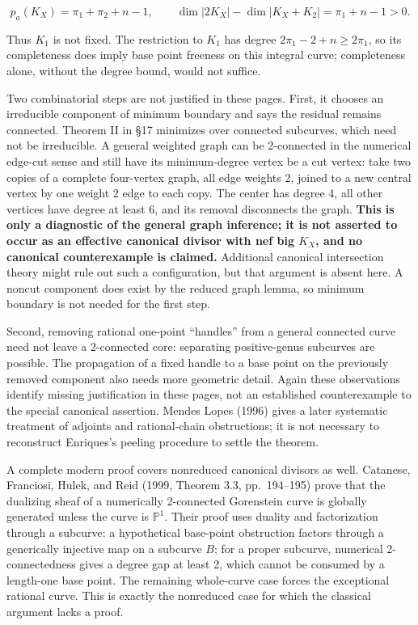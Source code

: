 \[
p_a(K_X)=\pi_1+\pi_2+n-1,\qquad
\dim|2K_X|-\dim|K_X+K_2|=\pi_1+n-1>0.
\]

Thus \(K_1\) is not fixed. The restriction to \(K_1\) has degree \(2\pi_1-2+n\ge 2\pi_1\), so its completeness does imply base point freeness on this integral curve; completeness alone, without the degree bound, would not suffice.

Two combinatorial steps are not justified in these pages. First, it chooses an irreducible component of minimum boundary and says the residual remains connected. Theorem II in §17 minimizes over connected subcurves, which need not be irreducible. A general weighted graph can be 2-connected in the numerical edge-cut sense and still have its minimum-degree vertex be a cut vertex: take two copies of a complete four-vertex graph, all edge weights 2, joined to a new central vertex by one weight 2 edge to each copy. The center has degree 4, all other vertices have degree at least 6, and its removal disconnects the graph. \textbf{This is only a diagnostic of the general graph inference; it is not asserted to occur as an effective canonical divisor with nef big \(K_X\), and no canonical counterexample is claimed.} Additional canonical intersection theory might rule out such a configuration, but that argument is absent here. A noncut component does exist by the reduced graph lemma, so minimum boundary is not needed for the first step.

Second, removing rational one-point ``handles'' from a general connected curve need not leave a 2-connected core: separating positive-genus subcurves are possible. The propagation of a fixed handle to a base point on the previously removed component also needs more geometric detail. Again these observations identify missing justification in these pages, not an established counterexample to the special canonical assertion. Mendes Lopes (1996) gives a later systematic treatment of adjoints and rational-chain obstructions; it is not necessary to reconstruct Enriques's peeling procedure to settle the theorem.

A complete modern proof covers nonreduced canonical divisors as well. Catanese, Franciosi, Hulek, and Reid (1999, Theorem 3.3, pp.~194--195) prove that the dualizing sheaf of a numerically 2-connected Gorenstein curve is globally generated unless the curve is \(\mathbb P^1\). Their proof uses duality and factorization through a subcurve: a hypothetical base-point obstruction factors through a generically injective map on a subcurve \(B\); for a proper subcurve, numerical 2-connectedness gives a degree gap at least 2, which cannot be consumed by a length-one base point. The remaining whole-curve case forces the exceptional rational curve. This is exactly the nonreduced case for which the classical argument lacks a proof.


